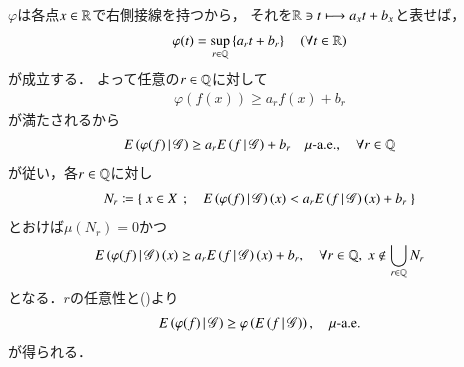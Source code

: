 	\begin{prf}
			$\varphi$は各点$x \in \mathbb{R}$で右側接線を持つから，
			それを$\mathbb{R} \ni t \longmapsto a_x t + b_x$と表せば，
			\begin{align}
				\varphi(t) = \operatorname*{sup}_{r \in \mathbb{Q}} \left\{ a_r t + b_r \right\} \quad (\forall t \in \mathbb{R})
				\label{eq:prp_properties_of_expanded_conditional_expectation_1}
			\end{align}
			が成立する．
			よって任意の$r \in \mathbb{Q}$に対して
			\begin{align}
				\varphi(f(x)) \geq a_r f(x) + b_r
			\end{align}
			が満たされるから
			\begin{align}
				E\left( \varphi(f) \, \middle|\, \mathscr{G} \right)
				\geq a_r E\left( f \, \middle|\, \mathscr{G} \right) + b_r 
				\quad \mbox{$\mu$-a.e.},
				\quad \forall r \in \mathbb{Q} 
			\end{align}
			が従い，各$r \in \mathbb{Q}$に対し
			\begin{align}
				N_r \coloneqq \left\{\ x \in X\ \, ; \quad E\left( \varphi(f) \, \middle|\, \mathscr{G} \right)(x)
				< a_r E\left( f \, \middle|\, \mathscr{G} \right)(x) + b_r\ \right\}
			\end{align}
			とおけば$\mu(N_r) = 0$かつ
			\begin{align}
				E\left( \varphi(f) \, \middle|\, \mathscr{G} \right)(x)
				\geq a_r E\left( f \, \middle|\, \mathscr{G} \right)(x) + b_r, 
				\quad \forall r \in \mathbb{Q},\ x \notin \bigcup_{r \in \mathbb{Q}} N_r
			\end{align}
			となる．$r$の任意性と()より
			\begin{align}
				E\left( \varphi(f) \, \middle|\, \mathscr{G} \right) \geq \varphi\left( E\left( f \, \middle|\, \mathscr{G} \right) \right),
				\quad \mbox{$\mu$-a.e.}
			\end{align}
			が得られる．
			\QED
	\end{prf}
	
